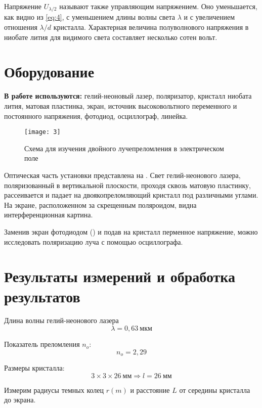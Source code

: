 \documentclass[a4paper, 12pt]{article}
\begin{document}
Напряжение $U_{\lambda/2}$ называют также управляющим напряжением. Оно
уменьшается, как видно из \eqref{eq:4}, с уменьшением длины волны
света $\lambda$ и с увеличением отношения $\lambda/d$ кристалла.
Характерная величина полуволнового напряжения в ниобате лития для
видимого света составляет несколько сотен вольт.






\section{Оборудование}
\textbf{В работе используются:} гелий-неоновый лазер, поляризатор,
кристалл ниобата лития, матовая пластинка, экран, источник
высоковольтного переменного и постоянного напряжения, фотодиод,
осциллограф, линейка.


\begin{figure}[H]
    \texttt{[image: 3]} 
    \caption{Схема для изучения двойного лучепреломления в
    электрическом поле}
    \label{fig:3}
\end{figure}

Оптическая часть установки представлена на . Свет
гелий-неонового лазера, поляризованный в вертикальной плоскости,
проходя сквозь матовую пластинку, рассеивается и падает на
двоякопреломляющий кристалл под различными углами. На экране,
расположенном за скрещенным поляроидом, видна интерференционная
картина.

Заменив экран фотодиодом () и подав на кристалл перменное
напряжение, можно исследовать поляризацию луча с помощью осциллографа.



\section{Результаты измерений и обработка результатов}
Длина волны гелий-неонового лазера
\[
    \lambda = 0,63\ \text{мкм}
\]

Показатель преломления $n_o$:
\[
    n_o = 2,29
\]

Размеры кристалла:
\[
    3\times 3 \times 26\ \text{мм} \Rightarrow l = 26\ \text{мм}
\]

Измерим радиусы темных колец $r(m)$ и расстояние $L$ от середины
кристалла до экрана. 
\end{document}
